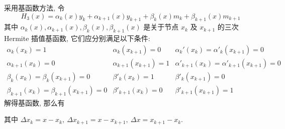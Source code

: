 \begin{theorem}
    \label{twoPointTripleHermiteInterpolation}
    采用基函数方法, 令 $$H_3(x)=\alpha_k(x)y_k+\alpha_{k+1}(x)y_{k+1}+\beta_k(x)m_k+\beta_{k+1}(x)m_{k+1}$$
    其中 $\alpha_k(x),\alpha_{k+1}(x),\beta_k(x),\beta_{k+1}(x)$ 是关于节点 $x_k$ 及 $x_{k+1}$ 的三次 Hermite 插值基函数, 它们应分别满足以下条件:
    $$\begin{array}{lll}
            \alpha _k(x_k)=1                        & \alpha _k(x_{k+1})=0     & \alpha _k'(x_k)=\alpha '_k(x_{k+1})=0         \\
            \alpha _{k+1}(x_k)=0                    & \alpha _{k+1}(x_{k+1})=1 & \alpha' _{k+1}(x_k)=\alpha '_{k+1}(x_{k+1})=0 \\
            \beta_k(x_k)=\beta_k(x_{k+1})=0         & \beta'_k(x_k)=1          & \beta'_k(x_{k+1})=0                           \\
            \beta_{k+1}(x_k)=\beta_{k+1}(x_{k+1})=0 & \beta'_{k+1}(x_k)=0      & \beta'_{k+1}(x_{k+1})=1
        \end{array}$$
    解得基函数, 那么有
    其中 $\Delta x_k=x-x_k,~\Delta x_{k+1}=x-x_{k+1},~\Delta x=x_{k+1}-x_k$.
\end{theorem}

